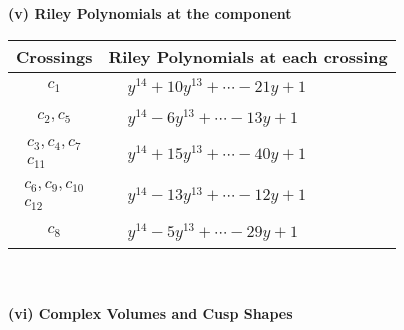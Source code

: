 \documentclass[1p]{elsarticle_modified}
\theoremstyle{definition}
\begin{document}
\newpage\renewcommand{\arraystretch}{1}
\flushleft \textbf{(v) Riley Polynomials at the component}\newline \\
\begin{tabular}{m{50pt}|m{274pt}}
Crossings & \hspace{64pt}Riley Polynomials at each crossing \\
\hline $$\begin{aligned}c_{1}\end{aligned}$$&$\begin{aligned}
&y^{14}+10 y^{13}+\cdots-21 y+1
\end{aligned}$\\
\hline $$\begin{aligned}c_{2},c_{5}\end{aligned}$$&$\begin{aligned}
&y^{14}-6 y^{13}+\cdots-13 y+1
\end{aligned}$\\
\hline $$\begin{aligned}c_{3},c_{4},c_{7}\\c_{11}\end{aligned}$$&$\begin{aligned}
&y^{14}+15 y^{13}+\cdots-40 y+1
\end{aligned}$\\
\hline $$\begin{aligned}c_{6},c_{9},c_{10}\\c_{12}\end{aligned}$$&$\begin{aligned}
&y^{14}-13 y^{13}+\cdots-12 y+1
\end{aligned}$\\
\hline $$\begin{aligned}c_{8}\end{aligned}$$&$\begin{aligned}
&y^{14}-5 y^{13}+\cdots-29 y+1
\end{aligned}$\\
\hline
\end{tabular}\\~\\
\newpage\flushleft \textbf{(vi) Complex Volumes and Cusp Shapes}
\end{document}
